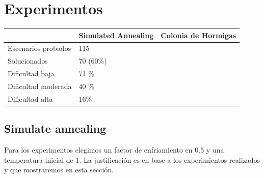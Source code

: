 \section{Experimentos}

\begin{table}
\centering
\begin{tabular}{|l|l|l|}
\hline
          & \textbf{Simulated Annealing} & \textbf{Colonia de Hormigas} \\ \hline
{Escenarios probados} &       115                       &                              \\ \hline
{Solucionados} &                      70 (60\%)      &                              \\ \hline
{Dificultad baja} &                     71 \%         &                              \\ \hline
{Dificultad moderada} &                  40 \%            &                              \\ \hline
{Dificultad alta} &                         16\%     &                              \\ \hline
\end{tabular}
\end{table}

\subsection{Simulate annealing}
Para los experimentos elegimos un factor de enfriamiento en 0.5 y una temperatura inicial de 1. La justificación es en base a los experimientos realizados y que mostraremos en esta sección. \\ \\

